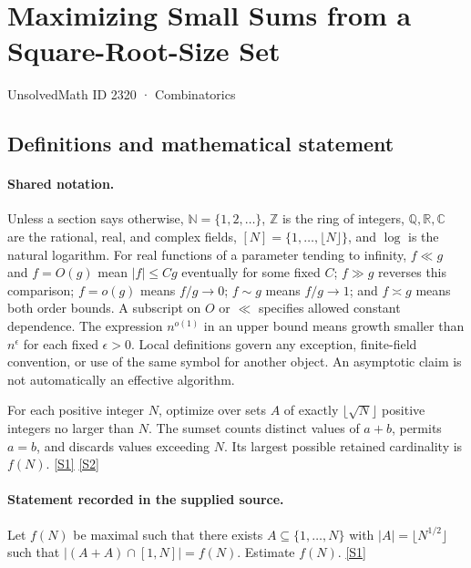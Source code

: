 \documentclass[11pt,a4paper]{article}
\newcommand{\N}{\mathbb{N}}
\newcommand{\Z}{\mathbb{Z}}
\newcommand{\Q}{\mathbb{Q}}
\newcommand{\R}{\mathbb{R}}
\newcommand{\C}{\mathbb{C}}
\newcommand{\sref}[2]{\hyperlink{source:#1:#2}{[S#2]}}
\begin{document}

\setcounter{section}{2319}

\section{Maximizing Small Sums from a Square-Root-Size Set}\label{2320}

{\small\sffamily UnsolvedMath ID 2320 · Combinatorics}

\subsection{Definitions and mathematical statement}

\paragraph{Shared notation.}Unless a section says otherwise, $\N=\{1,2,\ldots\}$,
$\Z$ is the ring of integers, $\Q,\R,\C$ are the rational, real, and complex
fields, $[N]=\{1,\ldots,\lfloor N\rfloor\}$, and $\log$ is the natural
logarithm. For real functions of a parameter tending to infinity,
$f\ll g$ and $f=O(g)$ mean $|f|\leq Cg$ eventually for some fixed $C$;
$f\gg g$ reverses this comparison; $f=o(g)$ means $f/g\to0$;
$f\sim g$ means $f/g\to1$; and $f\asymp g$ means both order bounds.
A subscript on $O$ or $\ll$ specifies allowed constant dependence.
The expression $n^{o(1)}$ in an upper bound means growth smaller than
$n^\epsilon$ for each fixed $\epsilon>0$. Local definitions govern any
exception, finite-field convention, or use of the same symbol for another
object. An asymptotic claim is not automatically an effective algorithm.



For each positive integer $N$, optimize over sets $A$ of exactly $\lfloor\sqrt N\rfloor$ positive integers no larger than $N$. The sumset counts distinct values of $a+b$, permits $a=b$, and discards values exceeding $N$. Its largest possible retained cardinality is $f(N)$. \sref{2320}{1} \sref{2320}{2}

\paragraph{Statement recorded in the supplied source.}
Let $f(N)$ be maximal such that there exists $A\subseteq \{1,\ldots,N\}$ with $\lvert A\rvert=\lfloor N^{1/2}\rfloor$ such that $\lvert (A+A)\cap [1,N]\rvert=f(N)$. Estimate $f(N)$. \sref{2320}{1}
\end{document}
